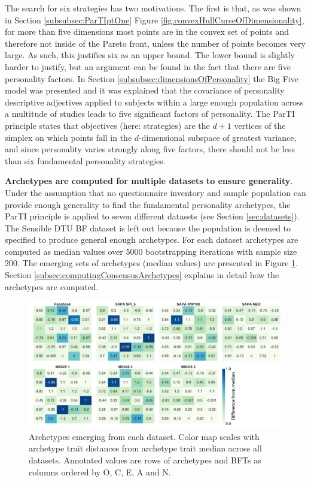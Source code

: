 The search for six strategies has two motivations. The first is that, as was shown in Section \ref{subsubsec:ParTIptOne} Figure \ref{fig:convexHullCurseOfDimensionality}, for more than five dimensions most points are in the convex set of points and therefore not inside of the Pareto front, unless the number of points becomes very large. As such, this justifies six as an upper bound.
The lower bound is slightly harder to justify, but an argument can be found in the fact that there are five personality factors.
In Section \ref{subsubsec:dimensionsOfPersonality} the Big Five model was presented and it was explained that the covariance of personality descriptive adjectives applied to subjects within a large enough population across a multitude of studies leads to five significant factors of personality.
The ParTI principle states that objectives (here: strategies) are the $d+1$ vertices of the simplex on which points fall in the $d$-dimensional subspace of greatest variance, and since personality varies strongly along five factors, there should not be less than six fundamental personality strategies.

\textbf{Archetypes are computed for multiple datasets to ensure generality}.
Under the assumption that no questionnaire inventory and sample population can provide enough generality to find the fundamental personality archetypes, the ParTI principle is applied to seven different datasets (see Section \ref{sec:datasets}).
The Sensible DTU BF dataset is left out because the population is deemed to specified to produce general enough archetypes.
For each dataset archetypes are computed as median values over 5000 bootstrapping iterations with sample size 200.
The emerging sets of archetypes (median values) are presented in Figure \ref{fig:medianDistances}. Section \ref{subsec:computingConsensusArchetypes} explains in detail how the archetypes are computed.

\begin{figure}
	\centering
	\includegraphics[width=\textwidth]{figures/medianDistances}
	\caption{\label{fig:medianDistances} Archetypes emerging from each dataset.
	Color map scales with archetype trait distances from archetype trait median across all datasets.
	Annotated values are rows of archetypes and BFTs as columns ordered by O, C, E, A and N.}
\end{figure}


